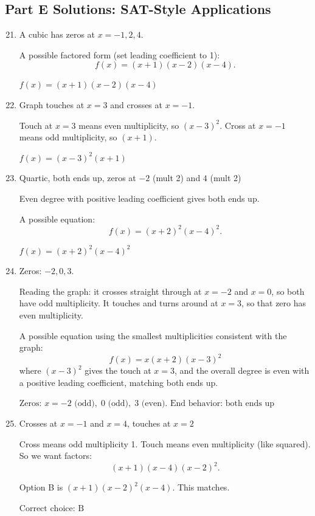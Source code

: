 \documentclass[14pt]{extarticle}
\begin{document}
\subsection*{Part E Solutions: SAT-Style Applications}
\begin{enumerate}
  \setcounter{enumi}{20}
  \item A cubic has zeros at \(x = -1, 2, 4.\)

  A possible factored form (set leading coefficient to 1):
  \[
  f(x) = (x + 1)(x - 2)(x - 4).
  \]

  \(\boxed{f(x) = (x + 1)(x - 2)(x - 4)}\)

  \item Graph touches at \(x = 3\) and crosses at \(x = -1\).

  Touch at \(x = 3\) means even multiplicity, so \((x - 3)^2.\)  
  Cross at \(x = -1\) means odd multiplicity, so \((x + 1).\)

  \(\boxed{f(x) = (x - 3)^2(x + 1)}\)

  \item Quartic, both ends up, zeros at \(-2\) (mult 2) and \(4\) (mult 2)

  Even degree with positive leading coefficient gives both ends up.

  A possible equation:
  \[
  f(x) = (x + 2)^2(x - 4)^2.
  \]

  \(\boxed{f(x) = (x + 2)^2(x - 4)^2}\)

  \item Zeros: \(-2, 0, 3.\)

  Reading the graph: it crosses straight through at \(x = -2\) and \(x = 0\), so both have odd multiplicity. It touches and turns around at \(x = 3\), so that zero has even multiplicity.

  A possible equation using the smallest multiplicities consistent with the graph:
  \[
  f(x) = x(x + 2)(x - 3)^2
  \]
  where \((x - 3)^2\) gives the touch at \(x = 3\), and the overall degree is even with a positive leading coefficient, matching both ends up.

  \(\boxed{\text{Zeros: } x = -2 \text{ (odd)},\; 0 \text{ (odd)},\; 3 \text{ (even)}. \text{ End behavior: both ends up}}\)

  \item Crosses at \(x = -1\) and \(x = 4\), touches at \(x = 2\)

  Cross means odd multiplicity 1. Touch means even multiplicity (like squared).  
  So we want factors:
  \[
  (x + 1)(x - 4)(x - 2)^2.
  \]

  Option B is \((x + 1)(x - 2)^2(x - 4)\). This matches.

  \(\boxed{\text{Correct choice: B}}\)
\end{enumerate}





\end{document}
